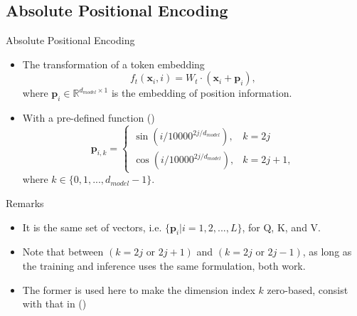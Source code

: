 \documentclass{beamer}
\begin{document}
	\subsection{Absolute Positional Encoding}
	\begin{frame}{Absolute Positional Encoding}		
		\begin{itemize}
			\item The transformation of a token embedding 			
			\begin{equation}\label{eqn:abs_pos_enc_func}
				f_t(\mathbf{x}_i, i) = W_t \cdot (\mathbf{x}_i + \mathbf{p}_i),
			\end{equation}
			where $\mathbf{p}_i \in \mathbb{R}^{d_{model} \times 1}$ is the embedding of position information.
			\item With a pre-defined function (\cite{vaswani2023attentionneed})
			\begin{equation}
				\mathbf{p}_{i,k} = 
				\begin{cases} 
					\sin(i/10000^{2j/d_{model}}), & k = 2j \\
					\cos(i/10000^{2j/d_{model}}), & k = 2j+1,
				\end{cases}				
			\end{equation}
			where $k \in \{0,1,...,d_{model}-1\}$.
		\end{itemize}			
		\begin{block}{Remarks}
			\begin{itemize}
				\item It is the same set of vectors, i.e. $\{\mathbf{p}_i|i=1,2,...,L\}$, for Q, K, and V.
				\item Note that between $(k=2j \text{ or } 2j+1)$ and $(k=2j \text{ or } 2j-1)$, as long as the training and inference uses the same formulation, both work. 
				\item The former is used here to make the dimension index $k$ zero-based, consist with that in (\cite{vaswani2023attentionneed,su2023roformerenhancedtransformerrotary})				
			\end{itemize}
		\end{block}		
	\end{frame}
	
\end{document}
